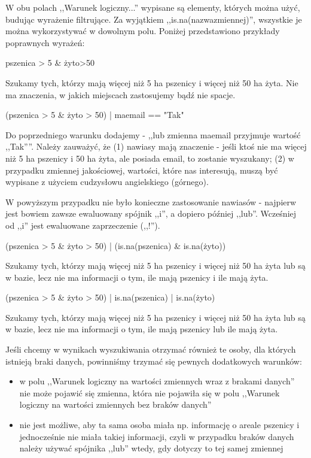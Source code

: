 \documentclass[12pt, twoside, hidelinks]{report}
\begin{document}
W obu polach ,,Warunek logiczny...'' wypisane są elementy, których można użyć, budując wyrażenie filtrujące. Za wyjątkiem ,,is.na(nazwa\textunderscore zmiennej)'', wszystkie je można wykorzystywać w dowolnym polu. Poniżej przedstawiono przykłady poprawnych wyrażeń:
\begin{center}
pszenica > 5 \& żyto>50
\end{center}
Szukamy tych, którzy mają więcej niż 5 ha pszenicy i więcej niż 50 ha żyta. Nie ma znaczenia, w jakich miejscach zastosujemy bądź nie spacje.
\begin{center}
(pszenica > 5 \& żyto > 50) | ma\textunderscore email == "Tak"
\end{center}
Do poprzedniego warunku dodajemy - ,,lub zmienna ma\textunderscore email przyjmuje wartość ,,Tak''''. Należy zauważyć, że (1) nawiasy mają znaczenie - jeśli ktoś nie ma więcej niż 5 ha pszenicy i 50 ha żyta, ale posiada email, to zostanie wyszukany; (2) w przypadku zmiennej jakościowej, wartości, które nas interesują, muszą być wypisane z użyciem cudzysłowu angielskiego (górnego).\par
W powyższym przypadku nie było konieczne zastosowanie nawiasów - najpierw jest bowiem zawsze ewaluowany spójnik ,,i'', a dopiero później ,,lub''. Wcześniej od ,,i'' jest ewaluowane zaprzeczenie (,,!'').
\begin{center}
(pszenica > 5 \& żyto > 50) | (is.na(pszenica) \& is.na(żyto))
\end{center}
Szukamy tych, którzy mają więcej niż 5 ha pszenicy i więcej niż 50 ha żyta lub są w bazie, lecz nie ma informacji o tym, ile mają pszenicy i ile mają żyta.
\begin{center}
(pszenica > 5 \& żyto > 50) | is.na(pszenica) | is.na(żyto)
\end{center}
Szukamy tych, którzy mają więcej niż 5 ha pszenicy i więcej niż 50 ha żyta lub są w bazie, lecz nie ma informacji o tym, ile mają pszenicy lub ile mają żyta. \par
Jeśli chcemy w wynikach wyszukiwania otrzymać również te osoby, dla których istnieją braki danych, powinniśmy trzymać się pewnych dodatkowych warunków:
\begin{itemize}
\item w polu ,,Warunek logiczny na wartości zmiennych wraz z brakami danych'' nie może pojawić się zmienna, która nie pojawiła się w polu ,,Warunek logiczny na wartości zmiennych bez braków danych''
\item nie jest możliwe, aby ta sama osoba miała np. informację o areale pszenicy i jednocześnie nie miała takiej informacji, czyli w przypadku braków danych należy używać spójnika ,,lub'' wtedy, gdy dotyczy to tej samej zmiennej
\end{itemize}
\end{document}
